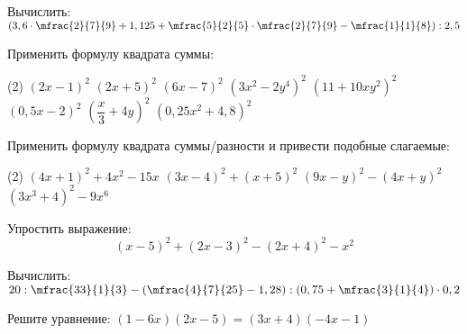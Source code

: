 \begin{class}[number=4]
	\begin{listofex}
		\item Вычислить: \( \left(  3,6 \cdot \mfrac{2}{7}{9} + 1,125 + \mfrac{5}{2}{5} \cdot  \mfrac{2}{7}{9} - \mfrac{1}{1}{8} \right) : 2,5 \)
		\item Применить формулу квадрата суммы:
		\begin{tasks}(2)
			\task \( (2x-1)^2 \)
			\task \( (2x+5)^2 \)
			\task \( (6x-7)^2 \)
			\task \( (3x^2-2y^4)^2 \)
			\task \( (11+10xy^2)^2 \)
			\task \( (0,5x-2)^2 \)
			\task \( \left( \dfrac{x}{3}+4y \right)^2 \)
			\task \( (0,25x^2+4,8)^2 \)
		\end{tasks}
		\item Применить формулу квадрата суммы/разности и привести подобные слагаемые:
		\begin{tasks}(2)
			\task \( (4x+1)^2+4x^2-15x \)
			\task \( (3x-4)^2+(x+5)^2 \)
			\task \( (9x-y)^2-(4x+y)^2 \)
			\task \( (3x^3+4)^2-9x^6 \)
		\end{tasks}
		\item Упростить выражение:
		\[ (x-5)^2+(2x-3)^2-(2x+4)^2-x^2 \]
	\end{listofex}
\end{class}

\begin{homework}[number=2]
	\begin{listofex}
		\item Вычислить: \( 20 : \mfrac{33}{1}{3} - \left( \mfrac{4}{7}{25} - 1,28 \right) : \left( 0,75 + \mfrac{3}{1}{4} \right) \cdot 0,2 \)
		\item Решите уравнение: \( (1-6x)(2x-5)=(3x+4)(-4x-1) \)
	\end{listofex}
\end{homework}

